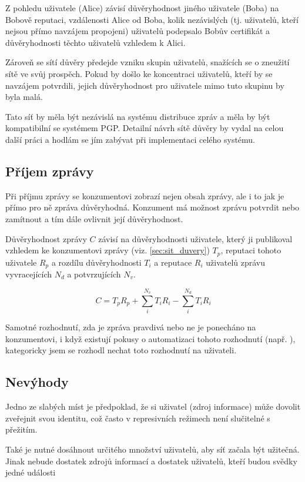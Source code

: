 \documentclass[a4papper]{article}
\begin{document}
Z pohledu uživatele (Alice) závisí důvěryhodnost jiného uživatele (Boba) na Bobově reputaci, vzdálenosti Alice od Boba, kolik nezávislých (tj. uživatelů, kteří nejsou přímo navzájem propojeni) uživatelů podepsalo Bobův certifikát a důvěryhodnosti těchto uživatelů vzhledem k Alici.

Zároveň se sítí důvěry předejde vzniku skupin uživatelů, snažících se o zneužití sítě ve svůj prospěch. Pokud by došlo ke koncentraci uživatelů, kteří by se navzájem potvrdili, jejich důvěryhodnost pro uživatele mimo tuto skupinu by byla malá.

Tato síť by měla být nezávislá na systému distribuce zpráv a měla by být kompatibilní se systémem PGP. Detailní návrh sítě důvěry by vydal na celou další práci a hodlám se jím zabývat při implementaci celého systému.

\subsection{Příjem zprávy}
\label{sec:prijem_zpravy}

Při příjmu zprávy se konzumentovi zobrazí nejen obsah zprávy, ale i to jak je přímo pro ně zpráva důvěryhodná. Konzument má možnost zprávu potvrdit nebo zamítnout a tím dále ovlivnit její důvěryhodnost.

Důvěryhodnost zprávy $C$ závisí na důvěryhodnosti uživatele, který ji publikoval vzhledem ke konzumentovi zprávy (viz. \ref{sec:sit_duvery}) $T_p$, reputaci tohoto uživatele $R_p$ a rozdílu důvěryhodnosti $T_i$ a reputace $R_i$ uživatelů zprávu vyvracejících $N_d$ a potvrzujících $N_v$.

$$C = T_p R_p + \sum_{i}^{N_v} T_i R_i - \sum_{i}^{N_d} T_i R_i$$

Samotné rozhodnutí, zda je zpráva pravdivá nebo ne je ponecháno na konzumentovi, i když existují pokusy o automatizaci tohoto rozhodnutí (např. \cite{giasemidis16}), kategoricky jsem se rozhodl nechat toto rozhodnutí na uživateli.

\subsection{Nevýhody}
\label{sec:nevyhody}
Jedno ze slabých míst je předpoklad, že si uživatel (zdroj informace) může dovolit zveřejnit svou identitu, což často v represivních režimech není slučitelné s přežitím.

Také je nutné dosáhnout určitého množství uživatelů, aby síť začala být užitečná. Jinak nebude dostatek zdrojů informací a dostatek uživatelů, kteří budou svědky jedné události
\end{document}
